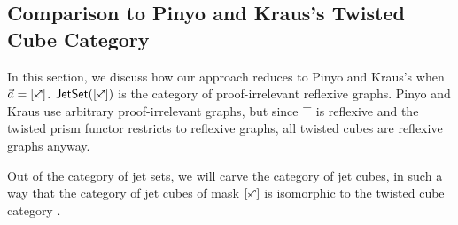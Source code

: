 \documentclass[a4paper]{article}
\begin{document}
\subsection{Comparison to Pinyo and Kraus's Twisted Cube Category}
In this section, we discuss how our approach reduces to Pinyo and Kraus's \cite{pinyo-twisted} when $\vec a = [\ypolar]$.
$\jetset{[\ypolar]}$ is the category of proof-irrelevant reflexive graphs.
Pinyo and Kraus use arbitrary proof-irrelevant graphs, but since $\top$ is reflexive and the twisted prism functor \cite[def.\ 4]{pinyo-twisted} restricts to reflexive graphs, all twisted cubes are reflexive graphs anyway.


Out of the category of jet sets, we will carve the category of jet cubes, in such a way that the category of jet cubes of mask $[\ypolar]$ is isomorphic to the twisted cube category \cite{pinyo-twisted}.




\end{document}
